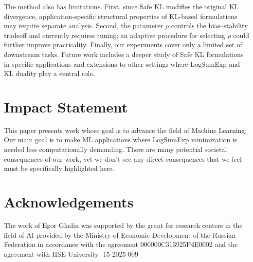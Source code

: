 \documentclass{article}
\theoremstyle{plain}
\theoremstyle{definition}
\theoremstyle{remark}
\begin{document}
The method also has limitations.
First, since Safe KL modifies the original KL divergence, application-specific structural properties of KL-based formulations may require separate analysis. 
Second, the parameter $\rho$ controls the bias--stability tradeoff and currently requires tuning; an adaptive procedure for selecting $\rho$ could further improve practicality. 
Finally, our experiments cover only a limited set of downstream tasks. 
Future work includes a deeper study of Safe KL formulations in specific applications and extensions to other settings where LogSumExp and KL duality play a central role. 


\section*{Impact Statement}

This paper presents work whose goal is to advance the field of Machine
Learning. Our main goal is to make ML applications where LogSumExp minimization is needed less computationally demanding. 
There are many potential societal consequences of our work, yet we don't see any direct consequences that we feel must be specifically highlighted here.


\section*{Acknowledgements}

The work of Egor Gladin was supported by the grant for research centers in the field of AI provided by the Ministry of Economic Development of the Russian Federation in accordance with the agreement 
000000C313925P4E0002 
and the agreement with HSE University 
-15-2025-009


\end{document}
